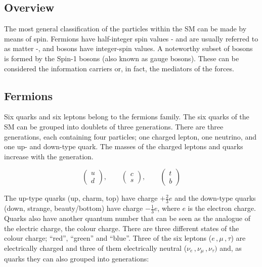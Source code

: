 		\subsection{Overview}
		\label{sec:SMov}

			The most general classification of the particles within the SM can be made by means of spin. Fermions have half-integer spin values - and are usually referred to as matter -, and bosons have integer-spin values. A noteworthy subset of bosons is formed by the Spin-1 bosons (also known as gauge bosons). These can be considered the information carriers or, in fact, the mediators of the forces. 


			\subsection*{Fermions}

				Six quarks and six leptons belong to the fermions family. The six quarks of the SM can be grouped into doublets of three generations. There are three generations, each containing four particles; one charged lepton, one neutrino, and one up- and down-type quark. The masses of the charged leptons and quarks increase with the generation. 

				\begin{equation*}
				\label{eqn:quark_doublets}
					\begin{pmatrix} u \\ d \end{pmatrix}, \qquad 
					\begin{pmatrix} c \\ s \end{pmatrix}, \qquad 
					\begin{pmatrix} t \\ b \end{pmatrix}
				\end{equation*}

				The up-type quarks (up, charm, top) have charge $+\frac{2}{3}e$ and the down-type quarks (down, strange, beauty/bottom) have charge $-\frac{1}{3}e$, where $e$ is the electron charge. Quarks also have another quantum number that can be seen as the analogue of the electric charge, the colour charge. There are three different states of the colour charge; ``red'', ``green'' and ``blue''. Three of the six leptons ($e\,,\mu\,,\tau$) are electrically charged and three of them electrically neutral ($\nu_e\,, \nu_{\mu}\,, \nu_{\tau})$ and, as quarks they can also grouped into generations:

